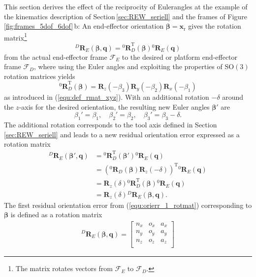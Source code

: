 \documentclass[robotics,article,accept,moreauthors,pdftex]{Definitions/mdpi}
\newcommand{\bm}[1]{\boldsymbol{#1}}
\newcommand{\rotmat}[2]{{{ }^{#1}\boldsymbol{R}}_{#2}}
\newcommand{\transp}[0]{{\mathrm{T}}}
\newcommand{\ks}[1]{{\mathcal{F}}_{#1}}
\begin{document}
This section derives the effect of the reciprocity of Euler\replaced[id=Sp]{ }{-}angles at the example of the kinematics description of Section\,\ref{sec:REW_seriell} and the frames of Figure\,\ref{fig:frames_5dof_6dof}\,b:
%
An end-effector orientation $\bm{\beta}=\bm{x}_{\mathrm{r}}$ gives the rotation matrix\footnote{The matrix rotates vectors from $\ks{E}$ to $\ks{D}$.}
%
\begin{equation}
\rotmat{D}{E}(\bm{\beta},\bm{q})
= 
\rotmat{0}{D}^\transp (\bm{\beta})\rotmat{0}{E}(\bm{q})
\label{equ:orierr_1_rotmat}
\end{equation}
%
from the actual end-effector frame $\ks{E}$ to the desired or platform end-effector frame $\ks{D}$,
where using the Euler angles and exploiting the properties of $\mathrm{SO(3)}$ rotation matrices yields
%
\begin{equation}
\rotmat{0}{D}^\transp(\bm{\beta})
=
\bm{R}_z(-\beta_3) \bm{R}_y(-\beta_2) \bm{R}_x(-\beta_1)
\end{equation}
%
as introduced in (\ref{equ:def_rmat_xyz}).
With an additional rotation $-\delta$ around the $z$-axis for the desired orientation, the resulting new Euler angles $\bm{\beta}'$ are
%
\begin{equation}
\beta_1'=\beta_1, \quad \beta_2'=\beta_2, \quad \beta_3'=\beta_3-\delta.
\end{equation}
%
The additional rotation corresponds to the tool axis defined in Section\,\ref{sec:REW_seriell} %
and leads to a new residual orientation error expressed as a rotation matrix
%
\begin{align}
    \rotmat{D}{E}(\bm{\beta}',\bm{q})
    &=
    \rotmat{0}{D}^\transp (\bm{\beta}') \rotmat{0}{E}(\bm{q}) \nonumber\\
    &=
    \left(\rotmat{0}{D}(\bm{\beta})\bm{R}_z(-\delta)\right)^\transp \rotmat{0}{E}(\bm{q}) \nonumber \\
    &=
    \bm{R}_z(\delta) \rotmat{0}{D}^\transp (\bm{\beta}) \rotmat{0}{E}(\bm{q}) \nonumber \\
    &=
    \bm{R}_z(\delta) \rotmat{D}{E}(\bm{\beta},\bm{q}).
    \label{equ:orierr_2_rotmat}
\end{align}
%
The first residual orientation error from (\ref{equ:orierr_1_rotmat}) corresponding to $\bm{\beta}$ is defined as a rotation matrix
%
\begin{align}
    \rotmat{D}{E}(\bm{\beta},\bm{q})
    =
    \begin{bmatrix}
        {n_x}&{o_x}&{a_x} \\
        {n_y}&{o_y}&{a_y} \\ 
        {n_z}&{o_z}&{a_z} \\ 
    \end{bmatrix}
    \label{equ:orierr_1_rotmat_def}
\end{align}
\end{document}
